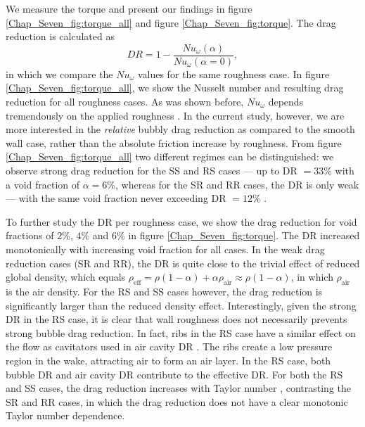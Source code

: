\documentclass{jfm}
\newcommand{\Nuw}{N\!u_{\omega}}
\newcommand{\DR}{D\!R}
\begin{document}
We measure the torque and  present our findings in figure \ref{Chap_Seven_fig:torque_all} and figure \ref{Chap_Seven_fig:torque}. The drag reduction is calculated as 
\begin{equation}
\DR = 1- \frac{\Nuw(\alpha)}{\Nuw(\alpha=0)},
 \label{eq:DR}
\end{equation}
 in which we compare the $\Nuw$ values for the same roughness case. In figure \ref{Chap_Seven_fig:torque_all}, we show the Nusselt number and resulting drag reduction for all roughness cases. As was shown before, $\Nuw$ depends tremendously on the applied roughness \citep{zhu18}.  In the current study, however, we are more interested in the {\it relative} bubbly drag reduction as compared to the smooth wall case, rather than the absolute friction increase by roughness. From figure  \ref{Chap_Seven_fig:torque_all}  two different regimes can be distinguished: we observe strong drag reduction for the SS and RS cases --- up to DR $=33\% $ with a void fraction of $\alpha=6\%$, whereas for the SR and RR cases, the DR is only weak --- with the same void fraction never exceeding DR $= 12\% $ .

 
To further study the DR per roughness case, we show the drag reduction for void fractions of $2\%$, $4\%$ and $6\%$ in figure \ref{Chap_Seven_fig:torque}. The DR increased monotonically with increasing void fraction for all cases. In the weak drag reduction cases (SR and RR), the DR is quite close to the trivial effect of reduced global density, which equals $\rho_{\text{eff}} = \rho(1-\alpha) + \alpha \rho_{\mathrm{air}} \approx \rho(1-\alpha)$, in which $\rho_{\mathrm{air}}$ is the air density.  For the RS and SS cases however, the drag reduction is significantly larger than the reduced density effect. Interestingly, given the strong DR in the RS case, it is clear that wall roughness does not necessarily prevents strong bubble drag reduction. In fact, ribs in the RS case have a similar effect on the flow as cavitators used in air cavity DR \citep{ver18,Zverkhovskyi2014}. The ribs create a low pressure region in the wake, attracting air to form an air layer. In the RS case, both bubble DR and air cavity DR contribute to the effective DR.   For both the RS and SS cases, the drag reduction increases with Taylor number \citep{gil13}, contrasting the SR and RR cases, in which the drag reduction does not have a clear monotonic Taylor number dependence. 
\end{document}
